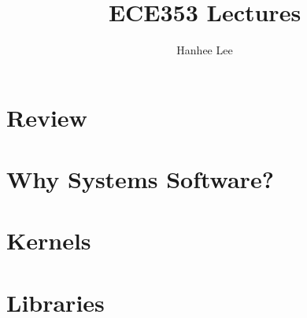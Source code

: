 \documentclass[twoside]{article}
\title{ECE353 Lectures}
\author{Hanhee Lee}
\begin{document}
\maketitle

\tableofcontents

\begin{definition}
    
\end{definition}

\begin{process}

\end{process}

\begin{motivation}

\end{motivation}

\begin{derivation}

\end{derivation}

\begin{warning}

\end{warning}

\begin{summary}

\end{summary}

\begin{algo}

\end{algo}

\begin{example}
    
\end{example}

\begin{faq}

\end{faq}
\cleardoublepage

\section{Review}

\cleardoublepage

\section{Why Systems Software?}

\cleardoublepage

\section{Kernels} 

\cleardoublepage

\section{Libraries}

\cleardoublepage
\end{document}
